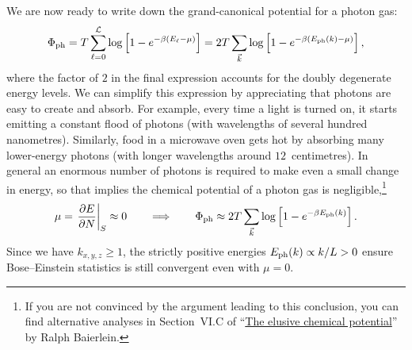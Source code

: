 We are now ready to write down the grand-canonical potential for a photon gas:
\begin{equation*}
  \Phi_{\text{ph}} = T \sum_{\ell = 0}^{\mathcal L} \log\left[1 - e^{-\beta (E_{\ell} - \mu)}\right] = 2T \sum_{\vec k} \log\left[1 - e^{-\beta (E_{\text{ph}}(k) - \mu)}\right],
\end{equation*}
where the factor of $2$ in the final expression accounts for the doubly degenerate energy levels.
We can simplify this expression by appreciating that photons are easy to create and absorb. %
For example, every time a light is turned on, it starts emitting a constant flood of photons (with wavelengths of several hundred nanometres).
Similarly, food in a microwave oven gets hot by absorbing many lower-energy photons (with longer wavelengths around $12$~centimetres).
In general an enormous number of photons is required to make even a small change in energy, so that  implies the chemical potential of a photon gas is negligible,\footnote{If you are not convinced by the argument leading to this conclusion, you can find alternative analyses in Section~VI.C of ``\href{https://canvas.liverpool.ac.uk/courses/76365/files/12294000}{The elusive chemical potential}'' by Ralph Baierlein.}
\begin{equation*}
  \mu = \left.\frac{\partial E}{\partial N}\right|_S \approx 0 \qquad \Longrightarrow \qquad \Phi_{\text{ph}} \approx 2T \sum_{\vec k} \log\left[1 - e^{-\beta E_{\text{ph}}(k)}\right].
\end{equation*}
Since we have $k_{x, y, z} \geq 1$, the strictly positive energies $E_{\text{ph}}(k) \propto k / L > 0$ ensure Bose--Einstein statistics is still convergent even with $\mu = 0$.

